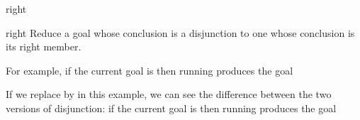 \begin{tactic}{right}
  \begin{tsyntax}[empty]{right}
    Reduce a goal whose conclusion is a disjunction to one whose
    conclusion is its right member.

    For example, if the current goal is
     then
    running 
    produces the goal

    If we replace \ec{\\/} by \ec{||} in this example, we can see the
    difference between the two versions of disjunction: if the current
    goal is 
    then running
     produces
    the goal 
  \end{tsyntax}
\end{tactic}
